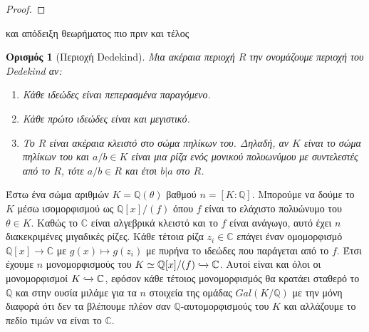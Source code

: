 \documentclass[oneside,a4paper]{article}
\newtheorem*{defn}{Ορισμός}
\newcommand {\tl}{\textlatin}
\newcommand{\Q}{\mathbb{Q}}
\begin{document}
\begin{proof}
\end{proof}



και απόδειξη θεωρήματος πιο πριν και τέλος































\pagebreak

\begin{defn}[Περιοχή \tl{Dedekind}]
	Μια ακέραια περιοχή $R$ την ονομάζουμε περιοχή του \tl{Dedekind} αν:
	\begin{enumerate}
		\item Κάθε ιδεώδες είναι πεπερασμένα παραγόμενο.
		\item Κάθε πρώτο ιδεώδες είναι και μεγιστικό.
		\item Το $R$ είναι ακέραια κλειστό στο σώμα πηλίκων του. Δηλαδή, αν $K$ είναι το σώμα πηλίκων του και $a/b \in K$ είναι μια ρίζα ενός μονικού πολυωνύμου με συντελεστές από το $R$, τότε $a/b \in R$ και έτσι $b|a$ στο $R$.
	\end{enumerate}
\end{defn}


\noindent Έστω ένα σώμα αριθμών $K=\Q(\theta)$ βαθμού $n = [K:\Q]$. Μπορούμε να δούμε το $K$ μέσω ισομορφισμού ως $\Q[x]/(f)$ όπου $f$ είναι το ελάχιστο πολυώνυμο του $\theta \in K$. Καθώς το $\mathbb{C}$ είναι αλγεβρικά κλειστό και το $f$ είναι ανάγωγο, αυτό έχει $n$ διακεκριμένες μιγαδικές ρίζες. Κάθε τέτοια ρίζα $z_i \in \mathbb{C}$ επάγει έναν ομομορφισμό $\Q[x] \rightarrow \mathbb{C}$ με $g(x) \mapsto g(z_i)$ με πυρήνα το ιδεώδες που παράγεται από το $f$. Έτσι έχουμε $n$ μονομορφισμούς του $K\simeq \Q[x]/(f) \xhookrightarrow{} \mathbb{C}$. Αυτοί είναι και όλοι οι μονομορφισμοί $K\xhookrightarrow{} \mathbb{C}$, εφόσον κάθε τέτοιος μονομορφισμός θα κρατάει σταθερό το $\Q$ και στην ουσία μιλάμε για τα $n$ στοιχεία της ομάδας $Gal(K/\Q)$ με την μόνη διαφορά ότι δεν τα βλέπουμε πλέον σαν $\Q$-αυτομορφισμούς του $K$ και αλλάζουμε το πεδίο τιμών να είναι το $\mathbb{C}$. 
\end{document}
